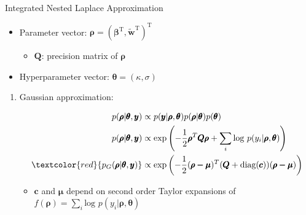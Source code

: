 \documentclass{beamer}
\begin{document}
\begin{frame}{Integrated Nested Laplace Approximation}{\citep{Rue2009}}
  \begin{itemize}
  \addtolength{\itemsep}{0.5\baselineskip}
  \item Parameter vector: $\pmb{\rho} = ( \pmb{\beta}^{\text{T}}, \widetilde{\pmb{w}}^{\text{T}} )^{\text{T}}$
              \begin{itemize}
              \addtolength{\itemsep}{0.5\baselineskip}
              \item $\pmb{Q}$: precision matrix of $\pmb{\rho}$
              \end{itemize}
  \item Hyperparameter vector: $\pmb{\theta} = (\kappa, \sigma )$
  \end{itemize}

\begin{enumerate}
\item Gaussian approximation:

    \begin{align}
    p(\pmb{\rho} |\pmb{\theta},\pmb{y}) & \propto p(\pmb{y}|\pmb{\rho}, \pmb{\theta}) p(\pmb{\rho}|\pmb{\theta}) p(\pmb{\theta}) \nonumber \\
    p(\pmb{\rho}|\pmb{\theta},\pmb{y}) & \propto \text{exp}\left(-\frac{1}{2}\pmb{\rho}^{T}\pmb{Q \rho} + \sum_{i} \text{log }p(y_{i}|\pmb{\rho},\pmb{\theta}) \right) \nonumber \\
    \textcolor{red}{p_{G}(\pmb{\rho}|\pmb{\theta}, \pmb{y})} & \propto \text{exp} \left( -\frac{1}{2}(\pmb{\rho-\mu})^{T} (\pmb{Q} + \text{diag}(\pmb{c}) ) (\pmb{\rho - \mu}) \right) \nonumber
    \end{align}

    \begin{itemize}
    \item $\pmb{c}$ and $\pmb{\mu}$ depend on second order Taylor expansions of $f(\pmb{\rho}) = \sum_{i} \text{log }p(y_{i}|\pmb{\rho},\pmb{\theta})$
    \end{itemize}

\end{enumerate}
\end{frame}
\end{document}
